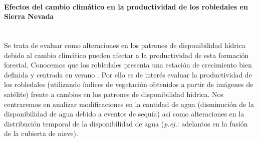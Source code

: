 \paragraph{Efectos del cambio climático en la productividad de los robledales en Sierra Nevada}\mbox{} \\
Se trata de evaluar como alteraciones en los patrones de disponibilidad hídrica debido al cambio climático pueden afectar a la productividad de esta formación forestal. Conocemos que los robledales presenta una estación de crecimiento bien definida y centrada en verano . Por ello es de interés evaluar la productividad de los robledales (utilizando índices de vegetación obtenidos a partir de imágenes de satélite) frente a cambios en los patrones de disponibilidad hídrica. Nos centraremos en analizar modificaciones en la cantidad de agua (disminución de la disponibilidad de agua debido a eventos de sequía) así como alteraciones en la distribución temporal de la disponibilidad de agua (\emph{p.ej.}: adelantos en la fusión de la cubierta de nieve).